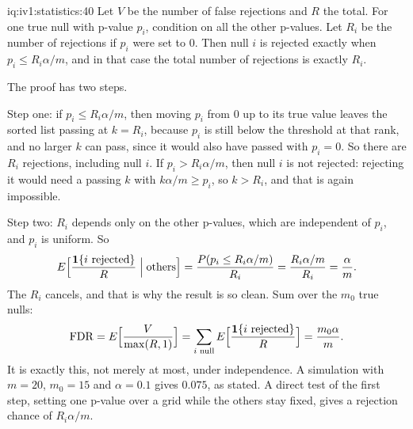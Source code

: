 \begin{solution}{iq:iv1:statistics:40}
Let $V$ be the number of false rejections and $R$ the total. For one true null with p-value $p_i$, condition on all the other p-values. Let $R_i$ be the number of rejections if $p_i$ were set to 0. Then null $i$ is rejected exactly when $p_i \le R_i\alpha/m$, and in that case the total number of rejections is exactly $R_i$.

The proof has two steps.

Step one: if $p_i \le R_i\alpha/m$, then moving $p_i$ from 0 up to its true value leaves the sorted list passing at $k = R_i$, because $p_i$ is still below the threshold at that rank, and no larger $k$ can pass, since it would also have passed with $p_i = 0$. So there are $R_i$ rejections, including null $i$. If $p_i > R_i\alpha/m$, then null $i$ is not rejected: rejecting it would need a passing $k$ with $k\alpha/m \ge p_i$, so $k > R_i$, and that is again impossible.

Step two: $R_i$ depends only on the other p-values, which are independent of $p_i$, and $p_i$ is uniform. So
\[
E\Bigl[\frac{\mathbf{1}\{i \text{ rejected}\}}{R} \Bigm| \text{others}\Bigr] = \frac{P(p_i \le R_i\alpha/m)}{R_i} = \frac{R_i\alpha/m}{R_i} = \frac{\alpha}{m}.
\]
The $R_i$ cancels, and that is why the result is so clean. Sum over the $m_0$ true nulls:
\[
\mathrm{FDR} = E\Bigl[\frac{V}{\max(R, 1)}\Bigr] = \sum_{i \text{ null}} E\Bigl[\frac{\mathbf{1}\{i \text{ rejected}\}}{R}\Bigr] = \frac{m_0\alpha}{m}.
\]
It is exactly this, not merely at most, under independence. A simulation with $m = 20$, $m_0 = 15$ and $\alpha = 0.1$ gives $0.075$, as stated. A direct test of the first step, setting one p-value over a grid while the others stay fixed, gives a rejection chance of $R_i\alpha/m$.

\end{solution}
